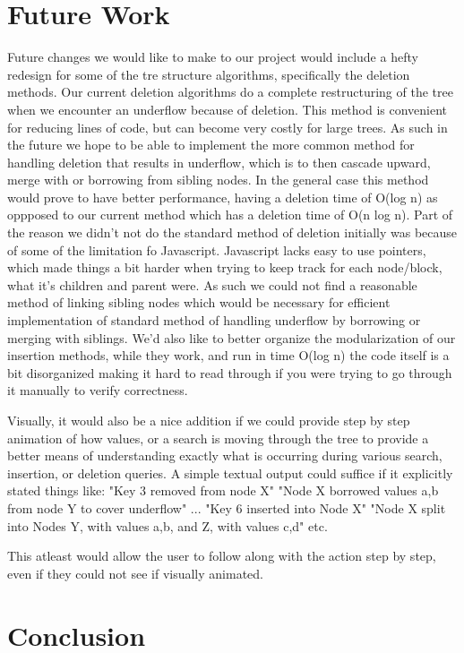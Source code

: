 \section{Future Work}

Future changes we would like to make to our project would include 
a hefty redesign for some of the tre structure algorithms, specifically the deletion methods.
Our current deletion algorithms do a complete restructuring of the tree when we encounter an
underflow because of deletion.  This method is convenient for reducing lines of code, but can 
become very costly for large trees.  As such in the future we hope to be able to implement the 
more common method for handling deletion that results in underflow, which is to then cascade upward, 
merge with or borrowing from sibling nodes.  In the general case this method would prove to have 
better performance, having a deletion time of O(log n) as oppposed to our current method which 
has a deletion time of O(n log n).  Part of the reason we didn't not do the standard method of deletion 
initially was because of some of the limitation fo Javascript.  Javascript lacks easy to use pointers, 
which made things a bit harder when trying to keep track for each node/block, what it's children and parent were.
As such we could not find a reasonable method of linking sibling nodes which would be necessary for 
efficient implementation of standard method of handling underflow by borrowing or merging with siblings.
    We'd also like to better organize the modularization of our insertion methods, while they work, 
and run in time O(log n) the code itself is a bit disorganized making it hard to read through if you were
trying to go through it manually to verify correctness.

Visually, it would also be a nice addition if we could provide step by step animation of how values, 
or a search is moving through the tree to provide a better means of understanding exactly what is 
occurring during various search, insertion, or deletion queries.  A simple textual output could suffice 
if it explicitly stated things like:
"Key 3 removed from node X"
"Node X borrowed values a,b from node Y to cover underflow"
...
"Key 6 inserted into Node X"
"Node X split into Nodes Y, with values a,b, and Z, with values c,d"
etc.

This atleast would allow the user to follow along with the action step by step, even if they could not 
see if visually animated.

\section{Conclusion}
